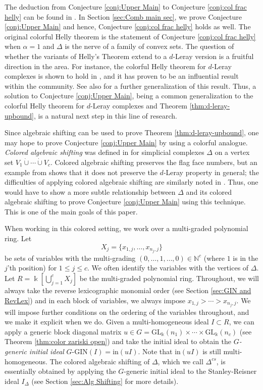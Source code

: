 \documentclass[a4paper, 10pt, reqno, english, ones]{amsart}  %
\theoremstyle{definition}
\theoremstyle{remark}
\begin{document}
\noindent The deduction from Conjecture \ref{conj:Upper Main} to Conjecture \ref{conj:col frac helly} can be found in \cite{Bulavka2021Optimal}. In Section \ref{sec:Comb main sec}, we prove Conjecture \ref{conj:Upper Main} and hence, Conjecture \ref{conj:col frac helly} holds as well. The original colorful Helly theorem is the statement of Conjecture \ref{conj:col frac helly} when $\alpha=1$ and $\Delta$ is the nerve of a family of convex sets. The question of whether the variants of Helly's Theorem extend to a $d$-Leray version is a fruitful direction in the area. For instance, the colorful Helly theorem for $d$-Leray complexes is shown to hold in \cite{kalai2005topological}, and it has proven to be an influential result within the community. See also \cite{holmsen2016intersection} for a further generalization of this result. Thus, a solution to Conjecture \ref{conj:Upper Main}, being a common generalization to the colorful Helly theorem for $d$-Leray complexes and Theorem \ref{thm:d-leray-upbound}, is a natural next step in this line of research.


Since algebraic shifting can be used to prove Theorem \ref{thm:d-leray-upbound}, one may hope to prove Conjecture \ref{conj:Upper Main} by using a colorful analogue. \textit{Colored algebraic shifting} was defined in \cite{Babson2004Face} for simplicial complexes $\Delta$ on a vertex set $V_1\dot{\cup}\cdots \dot{\cup} V_{c}$. Colored algebraic shifting preserves the flag face numbers, but an example from \cite{Murai2008Betti} shows that it does not preserve the $d$-Leray property in general; the difficulties of applying colored algebraic shifting are similarly noted in \cite{Bulavka2021Optimal}. Thus, one would have to show a more subtle relationship between $\Delta$ and its colored algebraic shifting to prove Conjecture \ref{conj:Upper Main} using this technique. This is one of the main goals of this paper.

When working in this colored setting, we work over a multi-graded polynomial ring. Let 
\[
X_j=\{x_{1,j},\dots,x_{n_j,j} \}
\]
be sets of variables with the multi-grading $(0,\dots,1,\dots,0)\in \mathbb{N}^c$ (where $1$ is in the $j$'th position) for $1\leq j\leq c$. We often identify the variables with the vertices of $\Delta$. Let $R=\Bbbk [\bigcup_{j=1}^c X_j]$ be the multi-graded polynomial ring. Throughout, we will always take the reverse lexicographic monomial order (see Section \ref{sec:GIN and RevLex}) and in each block of variables, we always impose $x_{1,j} > \cdots > x_{n_j,j}$. We will impose further conditions on the ordering of the variables throughout, and we make it explicit when we do. Given a multi-homogeneous ideal $I\subset R$, we can apply a generic block diagonal matrix $u\in G=\textrm{GL}_{\Bbbk }(n_1)\times \cdots \times \textrm{GL}_{\Bbbk }(n_c)$ (see Theorem \ref{thm:color zariski open}) and take the initial ideal to obtain the \textit{$G$-generic initial ideal} $G\textrm{-GIN}(I)=\textrm{in}(uI)$. Note that $\textrm{in}(uI)$ is still multi-homogeneous. The colored algebraic shifting of $\Delta$, which we call $\Delta^{cs}$, is essentially obtained by applying the $G$-generic initial ideal to the Stanley-Reisner ideal $I_\Delta$ (see Section \ref{sec:Alg Shifting} for more details). 
\end{document}
